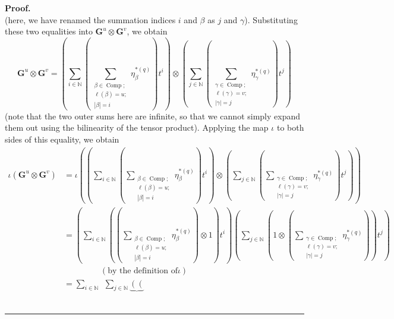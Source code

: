 \documentclass[numbers=enddot,12pt,final,onecolumn,notitlepage]{scrartcl}%
\theoremstyle{definition}
\newenvironment{proof}[1][Proof]{\noindent\textbf{#1.} }{\ \rule{0.5em}{0.5em}}
\let\sumnonlimits\sum
\renewcommand{\sum}{\sumnonlimits\limits}
\begin{document}
\begin{proof}
\[\]
(here, we have renamed the summation indices $i$ and $\beta$ as $j$ and
$\gamma$). Substituting these two equalities into $\mathbf{G}^{u}%
\otimes\mathbf{G}^{v}$, we obtain%
\[
\mathbf{G}^{u}\otimes\mathbf{G}^{v}=\left(  \sum_{i\in\mathbb{N}}\left(
\sum_{\substack{\beta\in\operatorname*{Comp};\\\ell\left(  \beta\right)
=u;\\\left\vert \beta\right\vert =i}}\eta_{\beta}^{\ast\left(  q\right)
}\right)  t^{i}\right)  \otimes\left(  \sum_{j\in\mathbb{N}}\left(
\sum_{\substack{\gamma\in\operatorname*{Comp};\\\ell\left(  \gamma\right)
=v;\\\left\vert \gamma\right\vert =j}}\eta_{\gamma}^{\ast\left(  q\right)
}\right)  t^{j}\right)
\]
(note that the two outer sums here are infinite, so that we cannot simply
expand them out using the bilinearity of the tensor product). Applying the map
$\iota$ to both sides of this equality, we obtain%
\begin{align*}
\iota\left(  \mathbf{G}^{u}\otimes\mathbf{G}^{v}\right)   &  =\iota\left(
\left(  \sum_{i\in\mathbb{N}}\left(  \sum_{\substack{\beta\in
\operatorname*{Comp};\\\ell\left(  \beta\right)  =u;\\\left\vert
\beta\right\vert =i}}\eta_{\beta}^{\ast\left(  q\right)  }\right)
t^{i}\right)  \otimes\left(  \sum_{j\in\mathbb{N}}\left(  \sum
_{\substack{\gamma\in\operatorname*{Comp};\\\ell\left(  \gamma\right)
=v;\\\left\vert \gamma\right\vert =j}}\eta_{\gamma}^{\ast\left(  q\right)
}\right)  t^{j}\right)  \right) \\
&  =\left(  \sum_{i\in\mathbb{N}}\left(  \left(  \sum_{\substack{\beta
\in\operatorname*{Comp};\\\ell\left(  \beta\right)  =u;\\\left\vert
\beta\right\vert =i}}\eta_{\beta}^{\ast\left(  q\right)  }\right)
\otimes1\right)  t^{i}\right)  \left(  \sum_{j\in\mathbb{N}}\left(
1\otimes\left(  \sum_{\substack{\gamma\in\operatorname*{Comp};\\\ell\left(
\gamma\right)  =v;\\\left\vert \gamma\right\vert =j}}\eta_{\gamma}%
^{\ast\left(  q\right)  }\right)  \right)  t^{j}\right) \\
&  \ \ \ \ \ \ \ \ \ \ \ \ \ \ \ \ \ \ \ \ \left(  \text{by the definition of
}\iota\right) \\
&  =\sum_{i\in\mathbb{N}}\ \ \sum_{j\in\mathbb{N}}\underbrace{\left(  \left(
}
\end{align*}
\end{proof}
\end{document}
